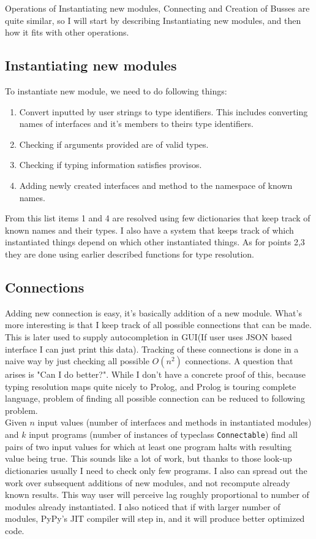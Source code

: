\documentclass[14pt]{report}
\begin{document}
Operations of Instantiating new modules, Connecting and Creation of Busses are quite similar, so I will start by describing Instantiating new modules, and then how it fits with other operations.

\subsection{Instantiating new modules}
To instantiate new module, we need to do following things:
\begin{enumerate}
    \item Convert inputted by user strings to type identifiers. This includes converting names of interfaces and it's members to theirs type identifiers.
    \item Checking if arguments provided are of valid types.
    \item Checking if typing information satisfies provisos.
    \item Adding newly created interfaces and method to the namespace of known names.
\end{enumerate}
From this list items 1 and 4 are resolved using few dictionaries that keep track of known names and their types. I also have a system that keeps track of which instantiated things depend on which other instantiated things. As for points 2,3 they are done using earlier described functions for type resolution.

\subsection{Connections}
Adding new connection is easy, it's basically addition of a new module. What's more interesting is that I keep track of all possible connections that can be made. This is later used to supply autocompletion in GUI(If user uses JSON based interface I can just print this data). Tracking of these connections is done in a naive way by just checking all possible $O(n^2)$ connections. A question that arises is "Can I do better?". While I don't have a concrete proof of this, because typing resolution maps quite nicely to Prolog, and Prolog is touring complete language, problem of finding all possible connection can be reduced to following problem. \\ 
Given $n$ input values (number of interfaces and methods in instantiated modules) and $k$ input programs (number of instances of typeclass \verb!Connectable!) find all pairs of two input values for which at least one program halts with resulting value being true.
This sounds like a lot of work, but thanks to those look-up dictionaries usually I need to check only few programs. I also can spread out the work over subsequent additions of new modules, and not recompute already known results. This way user will perceive lag roughly proportional to number of modules already instantiated. I also noticed that if with larger number of modules, PyPy's JIT compiler will step in, and it will produce better optimized code.
\end{document}
